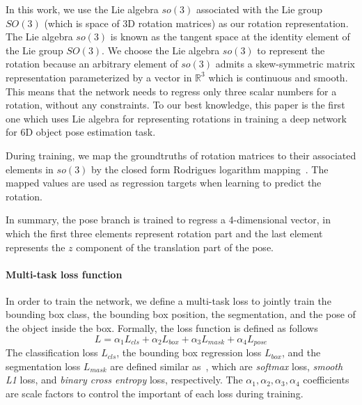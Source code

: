 \documentclass[conference]{IEEEtran}
\newcommand\red[1]{{\color{black}#1}}
\def\R{{\mathbb R}}
\begin{document}
In this work, we use the Lie algebra $so(3)$ associated with the Lie group $SO(3)$ (which is space of 3D rotation matrices) as our rotation representation. 
The Lie algebra $so(3)$  is known as the tangent space at the identity element of the Lie group $SO(3)$. 
We choose the Lie algebra $so(3)$ to represent the rotation because an arbitrary element of $so(3)$ admits a skew-symmetric matrix representation parameterized by a vector in $\R^3$ which is continuous and smooth.
This means that the network needs to regress only three scalar numbers for a rotation, without any constraints. 
To our best knowledge, this paper is the first one which uses Lie algebra for representing rotations in training a deep network for 6D object pose estimation task. 

During training, we map the groundtruths of rotation matrices to their associated elements in $so(3)$ by the closed form Rodrigues logarithm mapping~\cite{log-exp-map}. %
The mapped values are used as regression targets when learning to predict the rotation. 

In summary, the pose branch is trained to regress a 4-dimensional vector, in which the first three elements represent rotation part and the last element represents the $z$ component of the  translation part of the pose. 

\paragraph{Multi-task loss function}
In order to train the network, we define a multi-task loss to jointly train the bounding
box class, the bounding box position, the segmentation, and the pose of the object inside the box. Formally, the loss function is defined as follows
\begin{equation}
 L=\alpha_1L_{cls} + \alpha_2L_{box} + \alpha_3L_{mask} + \alpha_4L_{pose} 
 \label{eq:allloss}
\end{equation}
  The classification loss $L_{cls}$, the bounding box regression loss $L_{box}$, and the segmentation loss $L_{mask}$ are defined similar as~\cite{Mask-RCNN}, which are \textit{softmax} loss, \textit{smooth L1} loss, and \textit{binary cross entropy} loss, respectively. The $\alpha_1, \alpha_2, \alpha_3, \alpha_4$  coefficients are scale factors to control the important of each loss during training. 
\end{document}
